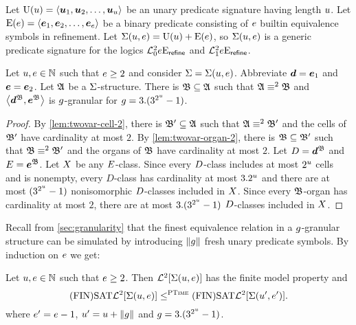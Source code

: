 
Let $\mathrm{U}(u) = \left\langle \bm{u}_{1},\bm{u}_{2},\dots,\bm{u}_{u} \right\rangle$ be an unary predicate
signature having length $u$.
Let $\mathrm{E}(e) = \left\langle \bm{e}_{1},\bm{e}_{2},\dots,\bm{e}_{e} \right\rangle$ be a binary predicate
consisting of $e$ builtin equivalence symbols in refinement.
Let $\mathrm{\Sigma}(u,e) = \mathrm{U}(u) + \mathrm{E}(e)$, so $\mathrm{\Sigma}(u,e)$ is a generic
predicate signature for the logics $\mathcal{L}^{2}_{0}{e}\mathrm{E}_{\mathsf{refine}}$ and
$\mathcal{L}^{2}_{1}{e}\mathrm{E}_{\mathsf{refine}}$.

\begin{remark}\label{rem:twovar-granular}
Let $u, e \in \mathbb{N}$ such that $e \geq 2$ and consider
$\mathrm{\Sigma} = \mathrm{\Sigma}(u,e)$.
Abbreviate $\bm{d} = \bm{e}_{1}$ and $\bm{e} = \bm{e}_{2}$.
Let $\mathfrak{A}$ be a $\mathrm{\Sigma}$-structure.
There is $\mathfrak{B} \subseteq \mathfrak{A}$ such that
$\mathfrak{A} \equiv^{2} \mathfrak{B}$ and $\left\langle \bm{d}^{\mathfrak{B}},\bm{e}^{\mathfrak{B}} \right\rangle$ is $g$-granular
for $g = 3.(3^{2^u}-1)$.
\end{remark}
\begin{proof}
By \cref{lem:twovar-cell-2}, there is $\mathfrak{B'} \subseteq \mathfrak{A}$ such that
$\mathfrak{A} \equiv^{2} \mathfrak{B'}$ and the cells of $\mathfrak{B'}$ have cardinality at most $2$.
By \cref{lem:twovar-organ-2}, there is $\mathfrak{B} \subseteq \mathfrak{B'}$ such that
$\mathfrak{B} \equiv^{2} \mathfrak{B'}$ and the organs of $\mathfrak{B}$ have cardinality at most $2$.
Let $D = \bm{d}^{\mathfrak{B}}$ and $E = \bm{e}^{\mathfrak{B}}$.
Let $X$ be any $E$-class.
Since every $D$-class includes at most $2^u$ cells and is nonempty, every
$D$-class has cardinality at most $3.2^u$ and there are at most
$(3^{2^u}-1)$ nonisomorphic $D$-classes included in $X$.
Since every $\mathfrak{B}$-organ has cardinality at most $2$, there are at most
$3.(3^{2^u}-1)$ $D$-classes included in $X$.
\end{proof}
Recall from \cref{sec:granularity} that the finest equivalence relation in a
$g$-granular structure can be simulated by introducing $\|g\|$ fresh unary
predicate symbols.
By induction on $e$ we get:
\begin{corollary}\label{cor:twovar-sub-1}
Let $u,e \in \mathbb{N}$ such that $e \geq 2$.
Then $\mathcal{L}^{2}[\mathrm{\Sigma}(u,e)]$ has the finite model property and
\[
  \mathrm{(FIN)SAT}\mathcal{L}^{2}[\mathrm{\Sigma}(u,e)] \leq^{\text{\normalfont{\scshape PTime}}}
  \mathrm{(FIN)SAT}\mathcal{L}^{2}[\mathrm{\Sigma}({u'},{e'})].
\]
where ${e'} = e - 1$, ${u'} = u + \|g\|$ and
$g = 3.(3^{2^u} - 1)$.
\end{corollary}

